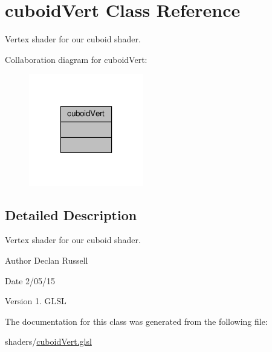 \hypertarget{classcuboid_vert}{\section{cuboid\-Vert Class Reference}
\label{classcuboid_vert}
}


Vertex shader for our cuboid shader.  




Collaboration diagram for cuboid\-Vert\-:\nopagebreak
\begin{figure}[H]
\begin{center}
\leavevmode
\includegraphics[width=142pt]{classcuboid_vert__coll__graph}
\end{center}
\end{figure}


\subsection{Detailed Description}
Vertex shader for our cuboid shader. 

\begin{DoxyAuthor}{Author}
Declan Russell 
\end{DoxyAuthor}
\begin{DoxyDate}{Date}
2/05/15 
\end{DoxyDate}
\begin{DoxyVersion}{Version}
1.  G\-L\-S\-L 
\end{DoxyVersion}


The documentation for this class was generated from the following file\-:\begin{DoxyCompactItemize}
\item 
shaders/\hyperlink{cuboid_vert_8glsl}{cuboid\-Vert.\-glsl}\end{DoxyCompactItemize}

